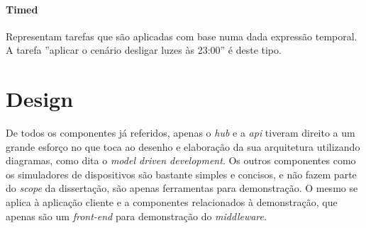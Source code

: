 \paragraph*{Timed} 
Representam tarefas que são aplicadas com base numa dada expressão temporal. A tarefa ''aplicar o cenário desligar luzes às 23:00'' é deste tipo.

\section{Design}

De todos os componentes já referidos, apenas o \textit{hub} e a \textit{api} tiveram direito a um grande esforço no que toca ao desenho e elaboração da sua arquitetura utilizando diagramas, como dita o \textit{model driven development}. Os outros componentes como os simuladores de dispositivos são bastante simples e concisos, e não fazem parte do \textit{scope} da dissertação, são apenas ferramentas para demonstração. O mesmo se aplica à aplicação cliente e a componentes relacionados à demonstração, que apenas são um \textit{front-end} para demonstração do \textit{middleware}.


